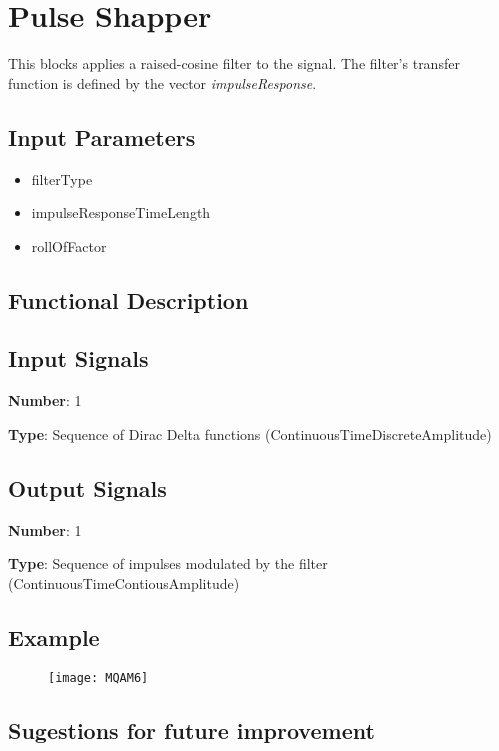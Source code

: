 \documentclass[a4paper]{article}
\begin{document}
\section*{Pulse Shapper}

This blocks applies a raised-cosine filter to the signal. The filter's transfer function is defined by the vector \textit{impulseResponse}.

\subsection*{Input Parameters}

\begin{itemize}
	\item filterType
	\item impulseResponseTimeLength
	\item rollOfFactor
\end{itemize}

\subsection*{Functional Description}

\subsection*{Input Signals}

\textbf{Number}: 1

\textbf{Type}: Sequence of Dirac Delta functions (ContinuousTimeDiscreteAmplitude)

\subsection*{Output Signals}

\textbf{Number}: 1

\textbf{Type}: Sequence of impulses modulated by the filter (ContinuousTimeContiousAmplitude)

\subsection*{Example}

\begin{figure}[h]
	\texttt{[image: MQAM6]}
\end{figure}

\subsection*{Sugestions for future improvement}
\end{document}
